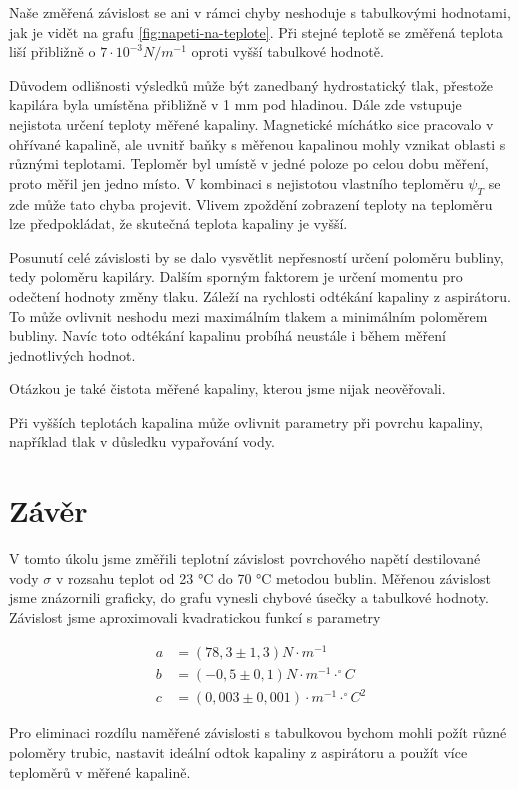 Naše změřená závislost se ani v rámci chyby neshoduje s tabulkovými hodnotami, jak je vidět na grafu \ref{fig:napeti-na-teplote}. Při stejné teplotě se změřená teplota liší přibližně o $7 \cdot 10^{-3} N / m^{-1}$ oproti vyšší tabulkové hodnotě.

Důvodem odlišnosti výsledků může být zanedbaný hydrostatický tlak, přestože kapilára byla umístěna přibližně v 1 mm pod hladinou. Dále zde vstupuje nejistota určení teploty měřené kapaliny. Magnetické míchátko sice pracovalo v ohřívané kapalině, ale uvnitř baňky s měřenou kapalinou mohly vznikat oblasti s různými teplotami. Teploměr byl umístě v jedné poloze po celou dobu měření, proto měřil jen jedno místo. V kombinaci s nejistotou vlastního teploměru $\psi_T$ se zde může tato chyba projevit. Vlivem zpoždění zobrazení teploty na teploměru lze předpokládat, že skutečná teplota kapaliny je vyšší.

Posunutí celé závislosti by se dalo vysvětlit nepřesností určení poloměru bubliny, tedy poloměru kapiláry. Dalším sporným faktorem je určení momentu pro odečtení hodnoty změny tlaku. Záleží na rychlosti odtékání kapaliny z aspirátoru. To může ovlivnit neshodu mezi maximálním tlakem a minimálním poloměrem bubliny. Navíc toto odtékání kapalinu probíhá neustále i během měření jednotlivých hodnot.

Otázkou je také čistota měřené kapaliny, kterou jsme nijak neověřovali.

Při vyšších teplotách kapalina může ovlivnit parametry při povrchu kapaliny, například tlak v důsledku vypařování vody.

\section{Závěr}

V tomto úkolu jsme změřili teplotní závislost povrchového napětí destilované vody $\sigma$ v rozsahu teplot od 23 °C do 70 °C metodou bublin. Měřenou závislost jsme znázornili graficky, do grafu vynesli chybové úsečky a tabulkové hodnoty. Závislost jsme aproximovali kvadratickou funkcí s parametry

\begin{align*}
    a &= (78,3 \pm 1,3) N \cdot m^{-1}\\
    b &= (-0,5 \pm 0,1) N \cdot m^{-1} \cdot ^\circ C\\
    c &= (0,003 \pm 0,001) \cdot m^{-1} \cdot ^\circ C^2
\end{align*}

Pro eliminaci rozdílu naměřené závislosti s tabulkovou bychom mohli požít různé poloměry trubic, nastavit ideální odtok kapaliny z aspirátoru a použít více teploměrů v měřené kapalině.